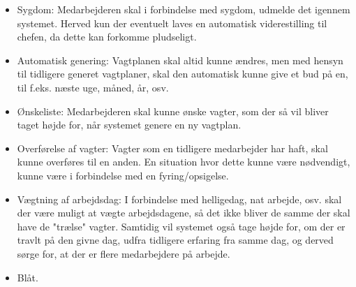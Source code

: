 \begin{itemize}
    \item Sygdom: Medarbejderen skal i forbindelse med sygdom, udmelde det igennem systemet. Herved kun der eventuelt laves en automatisk viderestilling til chefen, da dette kan forkomme pludseligt.
    \item Automatisk genering: Vagtplanen skal altid kunne ændres, men med hensyn til tidligere generet vagtplaner, skal den automatisk kunne give et bud på en, til f.eks. næste uge, måned, år, osv.
    \item Ønskeliste: Medarbejderen skal kunne ønske vagter, som der så vil bliver taget højde for, når systemet genere en ny vagtplan.
    \item Overførelse af vagter: Vagter som en tidligere medarbejder har haft, skal kunne overføres til en anden. En situation hvor dette kunne være nødvendigt, kunne være i forbindelse med en fyring/opsigelse. 
    \item Vægtning af arbejdsdag: I forbindelse med helligedag, nat arbejde, osv. skal der være muligt at vægte arbejdsdagene, så det ikke bliver de samme der skal have de "trælse" vagter. Samtidig vil systemet også tage højde for, om der er travlt på den givne dag, udfra tidligere erfaring fra samme dag, og derved sørge for, at der er flere medarbejdere på arbejde.
    
    \item Blåt.
    
\end{itemize}




